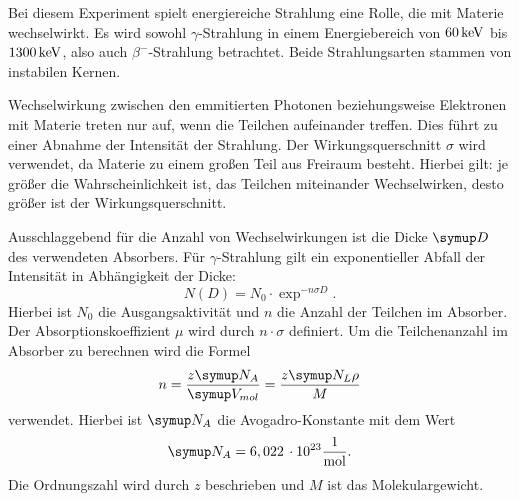 Bei diesem Experiment spielt energiereiche Strahlung eine Rolle, die mit Materie
wechselwirkt. Es wird sowohl $\gamma$-Strahlung in einem Energiebereich von
$60\,\si{\kilo\electronvolt}$ bis $1300\,\si{\kilo\electronvolt}$, also auch $\beta^{-}$-Strahlung betrachtet. Beide
Strahlungsarten stammen von instabilen Kernen.

Wechselwirkung zwischen den emmitierten Photonen beziehungsweise Elektronen mit
Materie treten nur auf, wenn die Teilchen aufeinander treffen. Dies führt zu einer
Abnahme der Intensität der Strahlung.
Der Wirkungsquerschnitt $\sigma$ wird verwendet, da Materie zu einem großen Teil
aus Freiraum besteht. Hierbei gilt: je größer die Wahrscheinlichkeit ist, das
Teilchen miteinander Wechselwirken, desto größer ist der Wirkungsquerschnitt.

Ausschlaggebend für die Anzahl von Wechselwirkungen ist die Dicke $\su{D}$ des
verwendeten Absorbers. Für $\gamma$-Strahlung gilt ein exponentieller Abfall der
Intensität in Abhängigkeit der Dicke:
\begin{equation}
  N(D) = N_0 \cdot \exp^{-n\sigma D}.
  \label{eqn:steig}
\end{equation}
Hierbei ist $N_0$ die Ausgangsaktivität und $n$ die Anzahl der Teilchen im Absorber.
Der Absorptionskoeffizient $\mu$ wird durch $n\cdot\sigma$ definiert. Um die
Teilchenanzahl im Absorber zu berechnen wird die Formel
\begin{equation}
  n = \frac{z\su{N_A}}{\su{V_{mol}}} = \frac{z\su{N_L}\rho}{M}
\end{equation}
verwendet. Hierbei ist $\su{N_A}$ die Avogadro-Konstante\cite{avo} mit dem Wert
\begin{equation*}
  \su{N_A} = 6,022\,\cdot10^{23}\frac{1}{\si{\mol}}.
\end{equation*}
Die Ordnungszahl wird durch $z$ beschrieben
und $M$ ist das Molekulargewicht.

